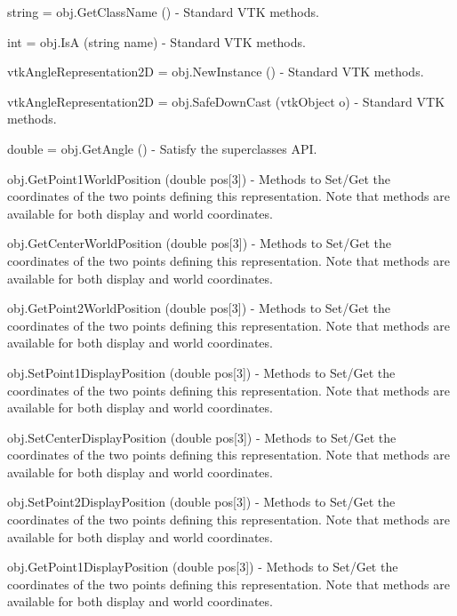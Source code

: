 \begin{DoxyItemize}
\item {\ttfamily string = obj.\-Get\-Class\-Name ()} -\/ Standard V\-T\-K methods.  
\item {\ttfamily int = obj.\-Is\-A (string name)} -\/ Standard V\-T\-K methods.  
\item {\ttfamily vtk\-Angle\-Representation2\-D = obj.\-New\-Instance ()} -\/ Standard V\-T\-K methods.  
\item {\ttfamily vtk\-Angle\-Representation2\-D = obj.\-Safe\-Down\-Cast (vtk\-Object o)} -\/ Standard V\-T\-K methods.  
\item {\ttfamily double = obj.\-Get\-Angle ()} -\/ Satisfy the superclasses A\-P\-I.  
\item {\ttfamily obj.\-Get\-Point1\-World\-Position (double pos\mbox{[}3\mbox{]})} -\/ Methods to Set/\-Get the coordinates of the two points defining this representation. Note that methods are available for both display and world coordinates.  
\item {\ttfamily obj.\-Get\-Center\-World\-Position (double pos\mbox{[}3\mbox{]})} -\/ Methods to Set/\-Get the coordinates of the two points defining this representation. Note that methods are available for both display and world coordinates.  
\item {\ttfamily obj.\-Get\-Point2\-World\-Position (double pos\mbox{[}3\mbox{]})} -\/ Methods to Set/\-Get the coordinates of the two points defining this representation. Note that methods are available for both display and world coordinates.  
\item {\ttfamily obj.\-Set\-Point1\-Display\-Position (double pos\mbox{[}3\mbox{]})} -\/ Methods to Set/\-Get the coordinates of the two points defining this representation. Note that methods are available for both display and world coordinates.  
\item {\ttfamily obj.\-Set\-Center\-Display\-Position (double pos\mbox{[}3\mbox{]})} -\/ Methods to Set/\-Get the coordinates of the two points defining this representation. Note that methods are available for both display and world coordinates.  
\item {\ttfamily obj.\-Set\-Point2\-Display\-Position (double pos\mbox{[}3\mbox{]})} -\/ Methods to Set/\-Get the coordinates of the two points defining this representation. Note that methods are available for both display and world coordinates.  
\item {\ttfamily obj.\-Get\-Point1\-Display\-Position (double pos\mbox{[}3\mbox{]})} -\/ Methods to Set/\-Get the coordinates of the two points defining this representation. Note that methods are available for both display and world coordinates.  

\end{DoxyItemize}
